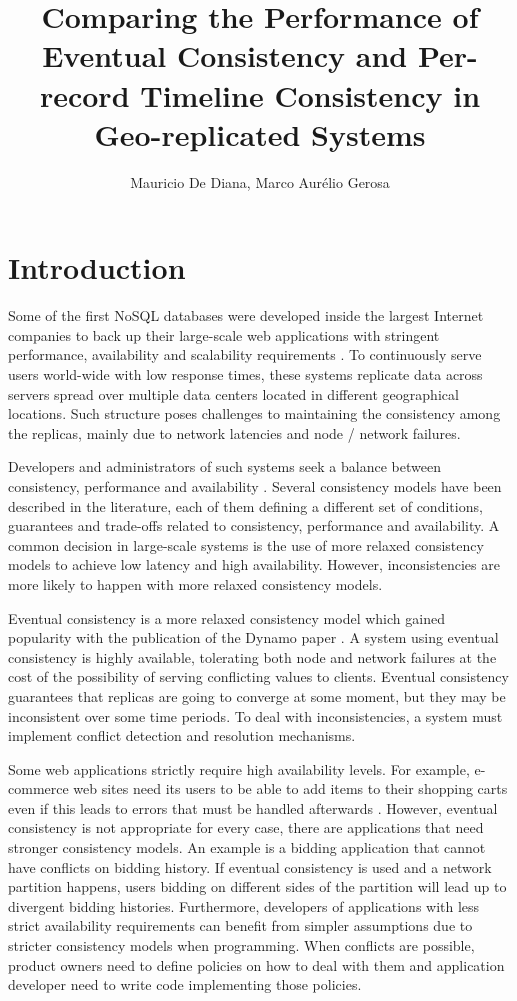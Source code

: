 \documentclass[man,floatsintext,12pt]{apa6}
\title{Comparing the Performance of Eventual Consistency and Per-record
Timeline Consistency in Geo-replicated Systems}
\author{Mauricio De Diana, Marco Aur\'{e}lio Gerosa}
\affiliation{Computer Science Department, University of S\~{a}o Paulo}
\begin{document}
\maketitle
\section{Introduction}

Some of the first NoSQL databases were developed inside the largest Internet
companies to back up their large-scale web applications with stringent
performance, availability and scalability requirements
\parencite{DeCandia2007,Chang2008,Cooper2008,Lakshman2010,Sumbaly2012}. To
continuously serve users world-wide with low response times, these systems
replicate data across servers spread over multiple data centers located in
different geographical locations. Such structure poses challenges to
maintaining the consistency among the replicas, mainly due to network latencies
and node / network failures.

Developers and administrators of such systems seek a balance between
consistency, performance and availability \parencite{Guerraoui2016}. Several
consistency models have been described in the literature, each of them defining
a different set of conditions, guarantees and trade-offs related to
consistency, performance and availability. A common decision in large-scale
systems is the use of more relaxed consistency models to achieve low latency
and high availability.  However, inconsistencies are more likely to happen with
more relaxed consistency models.

Eventual consistency is a more relaxed consistency model which gained
popularity with the publication of the Dynamo paper
\parencite{DeCandia2007,Lakshman2010,Sumbaly2012,Riak2013}. A system using
eventual consistency is highly available, tolerating both node and network
failures at the cost of the possibility of serving conflicting values to clients.
Eventual consistency guarantees that replicas are going to converge at some
moment, but they may be inconsistent over some time periods. To deal with
inconsistencies, a system must implement conflict detection and resolution
mechanisms.

Some web applications strictly require high availability levels. For example,
e-commerce web sites need its users to be able to add items to their shopping
carts even if this leads to errors that must be handled afterwards
\parencite{DeCandia2007}. However, eventual consistency is not appropriate for
every case, there are applications that need stronger consistency models. An
example is a bidding application that cannot have conflicts on bidding history.
If eventual consistency is used and a network partition happens, users bidding
on different sides of the partition will lead up to divergent bidding
histories. Furthermore, developers of applications with less strict
availability requirements can benefit from simpler assumptions due to stricter
consistency models when programming. When conflicts are possible, product
owners need to define policies on how to deal with them and application
developer need to write code implementing those policies.
\end{document}
